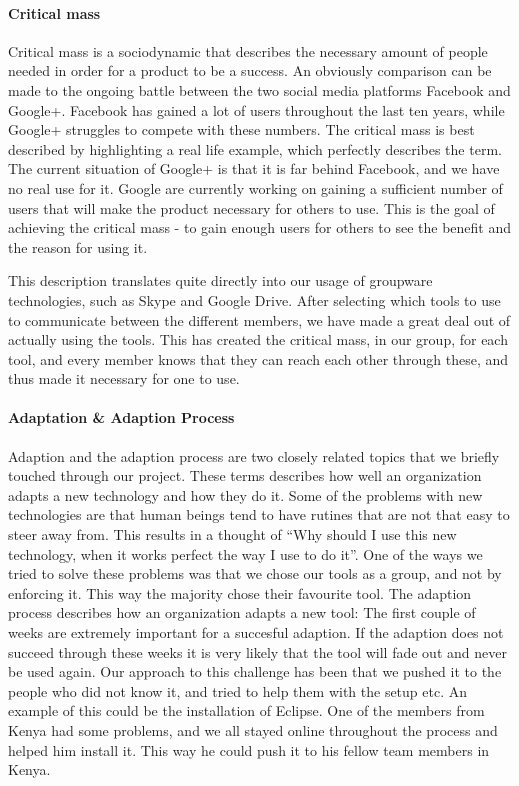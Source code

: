 \paragraph{Critical mass} \label{par:criticalmass}
Critical mass is a sociodynamic that describes the necessary amount of people needed in order for a product to be a success. An obviously comparison can be made to the ongoing battle between the two social media platforms Facebook and Google+. Facebook has gained a lot of users throughout the last ten years, while Google+ struggles to compete with these numbers. The critical mass is best described by highlighting a real life example, which perfectly describes the term. The current situation of Google+ is that it is far behind Facebook, and we have no real use for it. Google are currently working on gaining a sufficient number of users that will make the product necessary for others to use. This is the goal of achieving the critical mass - to gain enough users for others to see the benefit and the reason for using it. 

This description translates quite directly into our usage of groupware technologies, such as Skype and Google Drive. After selecting which tools to use to communicate between the different members, we have made a great deal out of actually using the tools. This has created the critical mass, in our group, for each tool, and every member knows that they can reach each other through these, and thus made it necessary for one to use.

\paragraph{Adaptation \& Adaption Process} \label{par:adaptationandadaptationprocess}
Adaption and the adaption process are two closely related topics that we briefly touched through our project. These terms describes how well an organization adapts a new technology and how they do it. Some of the problems with new technologies are that human beings tend to have rutines that are not that easy to steer away from. This results in a thought of ``Why should I use this new technology, when it works perfect the way I use to do it''. One of the ways we tried to solve these problems was that we chose our tools as a group, and not by enforcing it. This way the majority chose their favourite tool. The adaption process describes how an organization adapts a new tool: The first couple of weeks are extremely important for a succesful adaption. If the adaption does not succeed through these weeks it is very likely that the tool will fade out and never be used again. Our approach to this challenge has been that we pushed it to the people who did not know it, and tried to help them with the setup etc. An example of this could be the installation of Eclipse. One of the members from Kenya had some problems, and we all stayed online throughout the process and helped him install it. This way he could push it to his fellow team members in Kenya.

